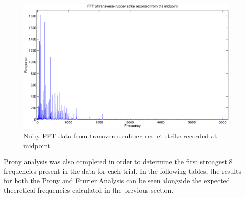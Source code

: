 \begin{figure}[h]
	\centering
	\includegraphics[width=\textwidth]{../figures/badFFT.eps}
	\caption{Noisy FFT data from transverse rubber mallet strike recorded at midpoint}
	\label{fig:badFFT}
\end{figure}


Prony analysis was also completed in order to determine the first strongest 8 frequencies present in the data for each trial. In the following tables, the results for both the Prony and Fourier Analysis can be seen alongside the expected theoretical frequencies calculated in the previous section. 



